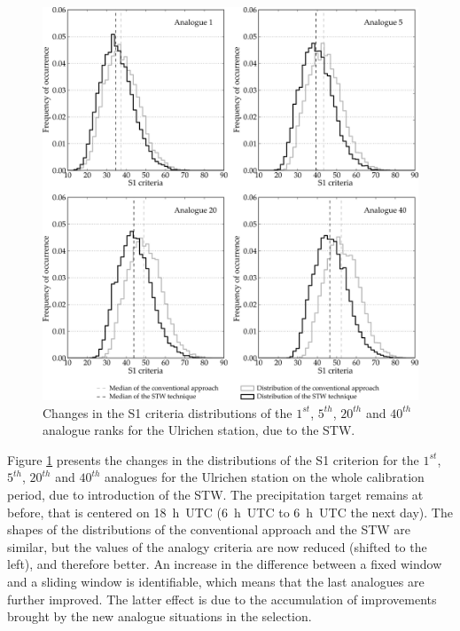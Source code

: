 \documentclass[hess]{copernicus}
\begin{document}
\begin{figure}[htb]
	\begin{center}
		\includegraphics[width=15cm]{figures/changes_S1_analogues.png}
	\end{center}
	\caption{Changes in the S1 criteria distributions of the $1^{st}$, $5^{th}$, $20^{th}$ and $40^{th}$ analogue ranks for the Ulrichen station, due to the STW.}
	\label{fig:changes_S1_analogues}
\end{figure}

Figure \ref{fig:changes_S1_analogues} presents the changes in the distributions of the S1 criterion for the $1^{st}$, $5^{th}$, $20^{th}$ and $40^{th}$ analogues for the Ulrichen station on the whole calibration period, due to introduction of the STW. The precipitation target remains at before, that is centered on 18~h~UTC (6~h~UTC to 6~h~UTC the next day). The shapes of the distributions of the conventional approach and the STW are similar, but the values of the analogy criteria are now reduced (shifted to the left), and therefore better. An increase in the difference between a fixed window and a sliding window is identifiable, which means that the last analogues are further improved. The latter effect is due to the accumulation of improvements brought by the new analogue situations in the selection.
\end{document}
